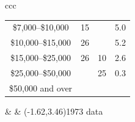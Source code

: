 \documentclass[t]{beamer}
\begin{document}
\begin{frame}[t]
{\begin{tabular}{ccc}
{\begin{tabular}{cccc}
\color{blue}   \Z\$7,000--\$10,000      & \color{blue}15 & \Z3 & 5.0\\
\color{blue}   \$10,000--\$15,000       & \color{blue}26 & \Z5 & 5.2\\
\color{blue}   \$15,000--\$25,000       & \color{blue}26 & 10 & 2.6\\
\color{blue}   \$25,000--\$50,000       & \color{blue}\Z8 & 25 & 0.3\\
\color{blue}   \$50,000 and over        & \color{blue}\Z1 
  \end{tabular}}
&\hspace{1.06in} & 
\rput[r](-1.62,3.46){\footnotesize 1973 data}
\end{tabular}}
\end{frame}
\end{document}
